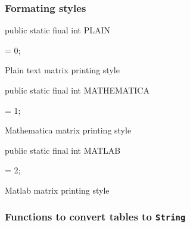 \subsubsection*{Formating styles}
\begin{code}

   public static final int PLAIN\begin{hide} = 0; \end{hide}
\end{code}
\begin{tabb}   Plain text matrix printing style
\end{tabb}
\begin{code}

   public static final int MATHEMATICA\begin{hide} = 1; \end{hide}
\end{code}
\begin{tabb}   Mathematica matrix printing style
\end{tabb}
\begin{code}

   public static final int MATLAB\begin{hide} = 2; \end{hide}
\end{code}
  \begin{tabb} Matlab matrix printing style
  \end{tabb}

\subsubsection*{Functions to convert tables to \texttt{String}}

